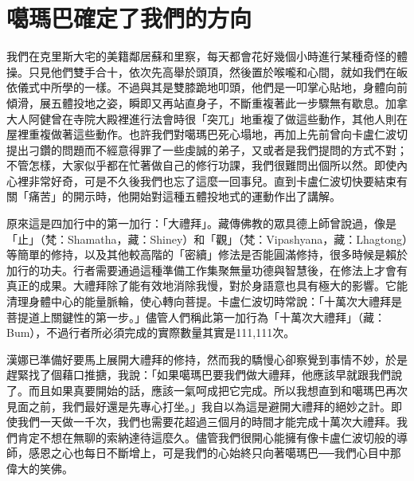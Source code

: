 \chapter{噶瑪巴確定了我們的方向}

我們在克里斯大宅的美籍鄰居蘇和里察，每天都會花好幾個小時進行某種奇怪的體操。只見他們雙手合十，依次先高舉於頭頂，然後置於喉嚨和心間，就如我們在皈依儀式中所學的一樣。不過與其是雙膝跪地叩頭，他們是一叩掌心貼地，身體向前傾滑，展五體投地之姿，瞬即又再站直身子，不斷重複著此一步驟無有歇息。加拿大人阿健曾在寺院大殿裡進行法會時很「突兀」地重複了做這些動作，其他人則在屋裡重複做著這些動作。也許我們對噶瑪巴死心塌地，再加上先前曾向卡盧仁波切提出刁鑽的問題而不經意得罪了一些虔誠的弟子，又或者是我們提問的方式不對；不管怎樣，大家似乎都在忙著做自己的修行功課，我們很難問出個所以然。即使內心裡非常好奇，可是不久後我們也忘了這麼一回事兒。直到卡盧仁波切快要結束有關「痛苦」的開示時，他開始對這種五體投地式的運動作出了講解。

原來這是四加行中的第一加行：「大禮拜」。藏傳佛教的眾具德上師曾說過，像是「止」（梵：Shamatha，藏：Shiney）和「觀」（梵：Vipashyana，藏：Lhagtong）等簡單的修持，以及其他較高階的「密續」修法是否能圓滿修持，很多時候是賴於加行的功夫。行者需要通過這種準備工作集聚無量功德與智慧後，在修法上才會有真正的成果。大禮拜除了能有效地消除我慢，對於身語意也具有極大的影響。它能清理身體中心的能量脈輪，使心轉向菩提。卡盧仁波切時常說：「十萬次大禮拜是菩提道上關鍵性的第一步。」儘管人們稱此第一加行為「十萬次大禮拜」（藏：Bum），不過行者所必須完成的實際數量其實是111,111次。

漢娜已準備好要馬上展開大禮拜的修持，然而我的驕慢心卻察覺到事情不妙，於是趕緊找了個藉口推搪，我說：「如果噶瑪巴要我們做大禮拜，他應該早就跟我們說了。而且如果真要開始的話，應該一氣呵成把它完成。所以我想直到和噶瑪巴再次見面之前，我們最好還是先專心打坐。」我自以為這是避開大禮拜的絕妙之計。即使我們一天做一千次，我們也需要花超過三個月的時間才能完成十萬次大禮拜。我們肯定不想在無聊的索納達待這麼久。儘管我們很開心能擁有像卡盧仁波切般的導師，感恩之心也每日不斷增上，可是我們的心始終只向著噶瑪巴──我們心目中那偉大的笑佛。

